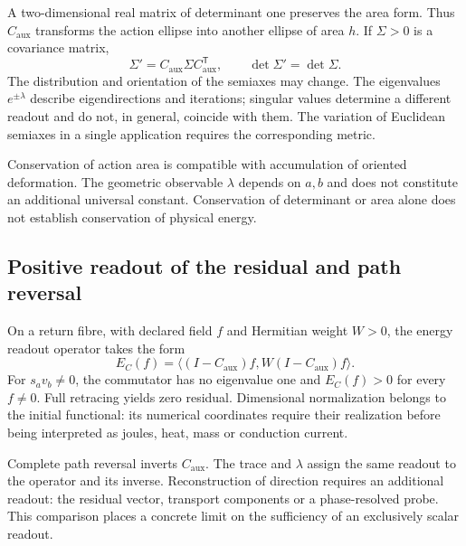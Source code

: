 A two-dimensional real matrix of determinant one preserves the area
form. Thus $C_{\mathrm{aux}}$ transforms the action ellipse into
another ellipse of area $h$. If $\Sigma>0$ is a covariance matrix,
\begin{equation}
 \Sigma'=C_{\mathrm{aux}}\Sigma C_{\mathrm{aux}}^{\mathsf T},
 \qquad \det\Sigma'=\det\Sigma.
 \label{md:aux:covarianza-area}
\end{equation}
The distribution and orientation of the semiaxes may change.
The eigenvalues $e^{\pm\lambda}$ describe eigendirections and
iterations; singular values determine a different readout and do not,
in general, coincide with them. The variation of Euclidean semiaxes
in a single application requires the corresponding metric.

Conservation of action area is compatible with accumulation of
oriented deformation. The geometric observable $\lambda$ depends on
$a,b$ and does not constitute an additional universal constant.
Conservation of determinant or area alone does not establish
conservation of physical energy.

\subsection{Positive readout of the residual and path reversal}
\label{md:aux:residuo}

On a return fibre, with declared field $f$ and Hermitian weight $W>0$,
the energy readout operator takes the form
\begin{equation}
 E_C(f)=\langle(I-C_{\mathrm{aux}})f,
                  W(I-C_{\mathrm{aux}})f\rangle.
 \label{md:aux:energia-residuo}
\end{equation}
For $s_av_b\ne0$, the commutator has no eigenvalue one and
$E_C(f)>0$ for every $f\ne0$. Full retracing yields zero residual.
Dimensional normalization belongs to the initial functional: its
numerical coordinates require their realization before being
interpreted as joules, heat, mass or conduction current.

Complete path reversal inverts $C_{\mathrm{aux}}$.
The trace and $\lambda$ assign the same readout to the operator and its
inverse. Reconstruction of direction requires an additional readout:
the residual vector, transport components or a phase-resolved probe.
This comparison places a concrete limit on the sufficiency of an
exclusively scalar readout.

